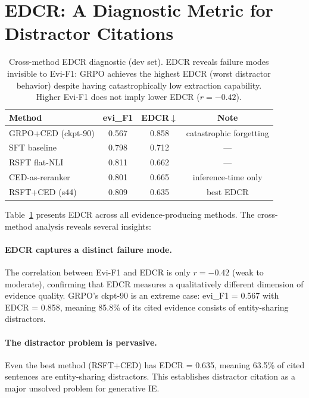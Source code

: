 \documentclass[11pt,a4paper]{article}
\begin{document}
\section{EDCR: A Diagnostic Metric for Distractor Citations}
\label{sec:edcr}

\begin{table}[t]
\centering
\caption{Cross-method EDCR diagnostic (dev set). EDCR reveals failure modes invisible to Evi-F1: GRPO achieves the highest EDCR (worst distractor behavior) despite having catastrophically low extraction capability. Higher Evi-F1 does not imply lower EDCR ($r = -0.42$).}
\label{tab:edcr_diagnostic}
\small
\begin{tabular}{lccc}
\toprule
\textbf{Method} & \textbf{evi\_F1} & \textbf{EDCR}$\downarrow$ & \textbf{Note} \\
\midrule
GRPO+CED (ckpt-90)   & 0.567 & 0.858 & catastrophic forgetting \\
SFT baseline          & 0.798 & 0.712 & --- \\
RSFT flat-NLI         & 0.811 & 0.662 & --- \\
CED-as-reranker       & 0.801 & 0.665 & inference-time only \\
RSFT+CED (s44)        & 0.809 & 0.635 & best EDCR \\
\bottomrule
\end{tabular}
\end{table}

Table~\ref{tab:edcr_diagnostic} presents EDCR across all evidence-producing methods.
The cross-method analysis reveals several insights:

\paragraph{EDCR captures a distinct failure mode.}
The correlation between Evi-F1 and EDCR is only $r = -0.42$ (weak to moderate), confirming that EDCR measures a qualitatively different dimension of evidence quality.
GRPO's ckpt-90 is an extreme case: evi\_F1 = 0.567 with EDCR = 0.858, meaning 85.8\% of its cited evidence consists of entity-sharing distractors.

\paragraph{The distractor problem is pervasive.}
Even the best method (RSFT+CED) has EDCR = 0.635, meaning 63.5\% of cited sentences are entity-sharing distractors.
This establishes distractor citation as a major unsolved problem for generative IE.
\end{document}

